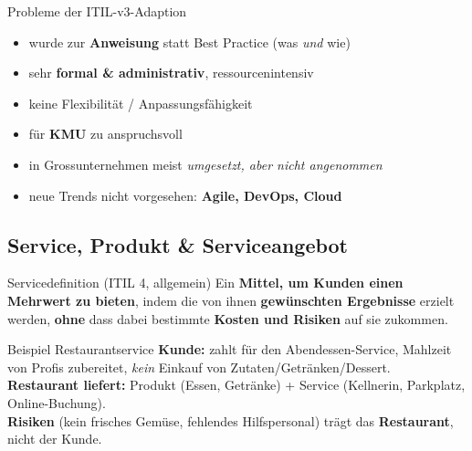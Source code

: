 \documentclass[a4paper, fontsize=7pt]{scrartcl}
\begin{document}
\begin{subbox}{Probleme der ITIL-v3-Adaption}
\begin{itemize}
    \item wurde zur \textbf{Anweisung} statt Best Practice (was \emph{und}
          wie)
    \item sehr \textbf{formal \& administrativ}, ressourcenintensiv
    \item keine Flexibilität / Anpassungsfähigkeit
    \item für \textbf{KMU} zu anspruchsvoll
    \item in Grossunternehmen meist \emph{umgesetzt, aber nicht angenommen}
    \item neue Trends nicht vorgesehen: \textbf{Agile, DevOps, Cloud}
\end{itemize}
\end{subbox}

\subsection{Service, Produkt \& Serviceangebot}

\begin{mainbox}{Servicedefinition (ITIL 4, allgemein)}
Ein \textbf{Mittel, um Kunden einen Mehrwert zu bieten}, indem die von ihnen
\textbf{gewünschten Ergebnisse} erzielt werden, \textbf{ohne} dass dabei
bestimmte \textbf{Kosten und Risiken} auf sie zukommen.
\end{mainbox}

\begin{subbox}{Beispiel Restaurantservice}
\textbf{Kunde:} zahlt für den Abendessen-Service, Mahlzeit von Profis
zubereitet, \emph{kein} Einkauf von Zutaten/Getränken/Dessert.\\
\textbf{Restaurant liefert:} Produkt (Essen, Getränke) + Service (Kellnerin,
Parkplatz, Online-Buchung).\\
\textbf{Risiken} (kein frisches Gemüse, fehlendes Hilfspersonal) trägt das
\textbf{Restaurant}, nicht der Kunde.
\end{subbox}
\end{document}
